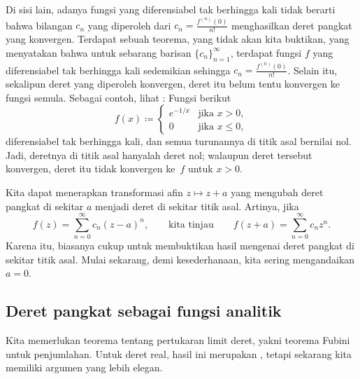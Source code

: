 Di sisi lain, adanya fungsi yang diferensiabel tak berhingga kali
tidak berarti bahwa bilangan $c_n$ yang diperoleh dari
$c_n = \frac{f^{(n)}(0)}{n!}$ menghasilkan deret pangkat yang konvergen.
Terdapat sebuah teorema, yang tidak akan kita buktikan,
yang menyatakan bahwa untuk sebarang barisan $\{ c_n \}_{n=1}^\infty$, terdapat
fungsi $f$ yang diferensiabel tak berhingga kali sedemikian sehingga
$c_n = \frac{f^{(n)}(0)}{n!}$.  Selain itu, sekalipun deret yang diperoleh
konvergen, deret itu belum tentu konvergen ke fungsi semula.
Sebagai contoh,
lihat :  Fungsi
berikut
\begin{equation*}
f(x) \coloneqq
\begin{cases}
e^{-1/x} & \text{jika } x > 0,\\
0        & \text{jika } x \leq 0,
\end{cases}
\end{equation*}
diferensiabel tak berhingga kali, dan semua turunannya di titik asal bernilai nol.
Jadi,
deretnya di titik asal hanyalah deret nol; walaupun
deret tersebut konvergen, deret itu tidak konvergen ke~$f$ untuk $x > 0$.

\medskip

Kita dapat menerapkan transformasi afin $z \mapsto z+a$ yang
mengubah deret pangkat di sekitar $a$ menjadi deret di sekitar titik asal.
Artinya, jika
\begin{equation*}
f(z) = \sum_{n=0}^\infty c_n {(z-a)}^n,
\qquad \text{kita tinjau} \qquad
f(z+a) = \sum_{n=0}^\infty c_n {z}^n.
\end{equation*}
Karena itu, biasanya
cukup untuk membuktikan hasil mengenai deret pangkat di sekitar titik asal.
Mulai sekarang, demi kesederhanaan, kita sering mengandaikan $a=0$.

\subsection{Deret pangkat sebagai fungsi analitik}

Kita memerlukan teorema tentang pertukaran limit deret, yakni
teorema Fubini untuk penjumlahan.  Untuk deret real, hasil ini merupakan
, tetapi sekarang kita memiliki
argumen yang lebih elegan.

